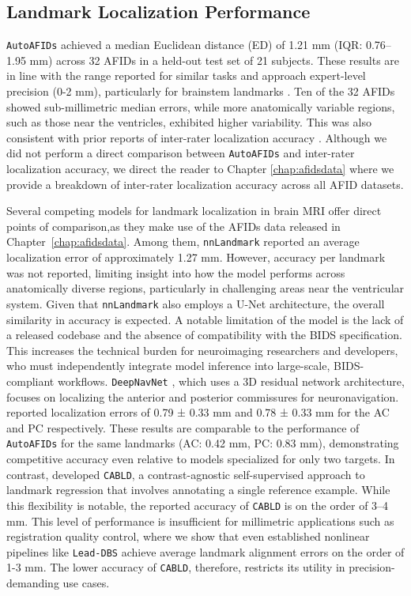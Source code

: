 \subsection{Landmark Localization Performance}

\texttt{AutoAFIDs} achieved a median Euclidean distance (ED) of 1.21 mm (IQR: 0.76–1.95 mm) across 32 AFIDs in a held-out test set of 21 subjects. These results are in line with the range reported for similar tasks \cite{Ertl2025-wu, Salari2024-iu, Edwards2021-su} and approach expert-level precision (0-2 mm), particularly for brainstem landmarks \cite{Abbass2022-lf}. Ten of the 32 AFIDs showed sub-millimetric median errors, while more anatomically variable regions, such as those near the ventricles, exhibited higher variability. This was also consistent with prior reports of inter-rater localization accuracy \cite{Lau2019-eh, Abbass2022-lf}. Although we did not perform a direct comparison between \texttt{AutoAFIDs} and inter-rater localization accuracy, we direct the reader to Chapter \ref{chap:afidsdata} where we provide a breakdown of inter-rater localization accuracy across all AFID datasets. 

Several competing models for landmark localization in brain MRI offer direct points of comparison,as they make use of the AFIDs data released in Chapter~\ref{chap:afidsdata}. Among them, \texttt{nnLandmark} \cite{Ertl2025-wu} reported an average localization error of approximately 1.27 mm. However, accuracy per landmark was not reported, limiting insight into how the model performs across anatomically diverse regions, particularly in challenging areas near the ventricular system. Given that \texttt{nnLandmark} also employs a U-Net architecture, the overall similarity in accuracy is expected. A notable limitation of the model is the lack of a released codebase and the absence of compatibility with the BIDS specification. This increases the technical burden for neuroimaging researchers and developers, who must independently integrate model inference into large-scale, BIDS-compliant workflows. \texttt{DeepNavNet} \cite{Edwards2021-su}, which uses a 3D residual network architecture, focuses on localizing the anterior and posterior commissures for neuronavigation. \cite{Edwards2021-su} reported localization errors of 0.79 ± 0.33 mm and 0.78 ± 0.33 mm for the AC and PC respectively. These results are comparable to the performance of \texttt{AutoAFIDs} for the same landmarks (AC: 0.42 mm, PC: 0.83 mm), demonstrating competitive accuracy even relative to models specialized for only two targets. In contrast, \cite{Salari2024-iu} developed \texttt{CABLD}, a contrast-agnostic self-supervised approach to landmark regression that involves annotating a single reference example. While this flexibility is notable, the reported accuracy of \texttt{CABLD} is on the order of 3–4 mm. This level of performance is insufficient for millimetric applications such as registration quality control, where we show that even established nonlinear pipelines like \texttt{Lead-DBS} achieve average landmark alignment errors on the order of 1-3 mm. The lower accuracy of \texttt{CABLD}, therefore, restricts its utility in precision-demanding use cases.

